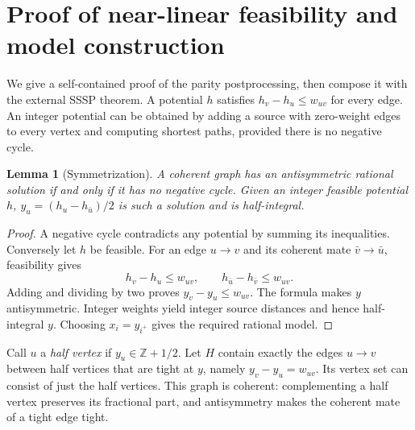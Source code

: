 \documentclass[manuscript,11pt,screen,nonacm]{acmart}
\newtheorem{lemma}[theorem]{Lemma}
\theoremstyle{definition}
\newcommand{\Z}{\mathbb Z}
\begin{document}
\section{Proof of near-linear feasibility and model construction}\label{sec:feasibility}
We give a self-contained proof of the parity postprocessing, then compose it with the external SSSP theorem. A potential $h$ satisfies $h_v-h_u\leq w_{uv}$ for every edge. An integer potential can be obtained by adding a source with zero-weight edges to every vertex and computing shortest paths, provided there is no negative cycle.

\begin{lemma}[Symmetrization]\label{lem:rational}
A coherent graph has an antisymmetric rational solution if and only if it has no negative cycle. Given an integer feasible potential $h$, $y_u=(h_u-h_{\bar u})/2$ is such a solution and is half-integral.
\end{lemma}
\begin{proof}
A negative cycle contradicts any potential by summing its inequalities. Conversely let $h$ be feasible. For an edge $u\to v$ and its coherent mate $\bar v\to\bar u$, feasibility gives
\[
 h_v-h_u\leq w_{uv},\qquad h_{\bar u}-h_{\bar v}\leq w_{uv}.
\]
Adding and dividing by two proves $y_v-y_u\leq w_{uv}$. The formula makes $y$ antisymmetric. Integer weights yield integer source distances and hence half-integral $y$. Choosing $x_i=y_{i^+}$ gives the required rational model.
\end{proof}

Call $u$ a \emph{half vertex} if $y_u\in\Z+1/2$. Let $H$ contain exactly the edges $u\to v$ between half vertices that are tight at $y$, namely $y_v-y_u=w_{uv}$. Its vertex set can consist of just the half vertices. This graph is coherent: complementing a half vertex preserves its fractional part, and antisymmetry makes the coherent mate of a tight edge tight.
\end{document}
